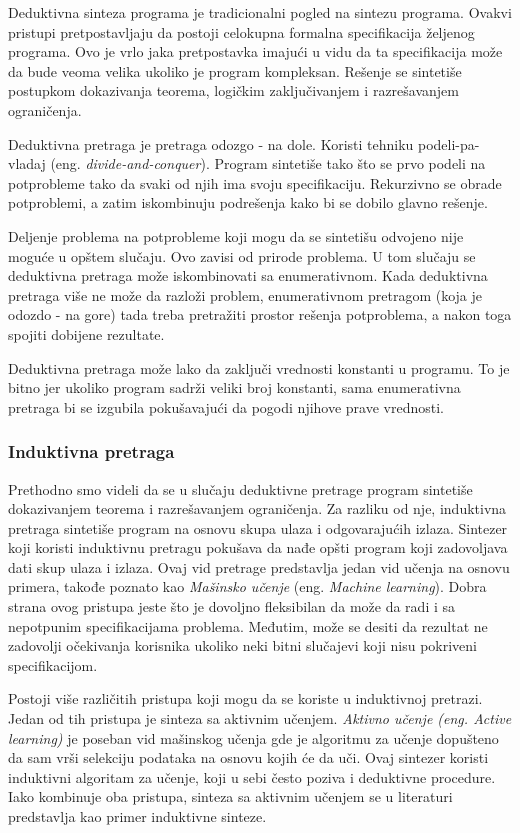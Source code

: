 Deduktivna sinteza programa je tradicionalni pogled na sintezu programa. Ovakvi pristupi pretpostavljaju da postoji celokupna formalna specifikacija željenog programa. Ovo je vrlo jaka pretpostavka imajući u vidu da ta specifikacija može da bude veoma velika ukoliko je program kompleksan. Rešenje se sintetiše postupkom dokazivanja teorema, logičkim zaključivanjem i razrešavanjem ograničenja.

Deduktivna pretraga je pretraga odozgo - na dole. Koristi tehniku podeli-pa-vladaj (eng. \emph{divide-and-conquer}). Program sintetiše tako što se prvo podeli na potprobleme tako da svaki od njih ima svoju specifikaciju. Rekurzivno se obrade potproblemi, a zatim iskombinuju podrešenja kako bi se dobilo glavno rešenje.

Deljenje problema na potprobleme koji mogu da se sintetišu odvojeno nije moguće u opštem slučaju. Ovo zavisi od prirode problema. U tom slučaju se deduktivna pretraga može iskombinovati sa enumerativnom. Kada deduktivna pretraga više ne može da razloži problem, enumerativnom pretragom (koja je odozdo - na gore) tada treba pretražiti prostor rešenja potproblema, a nakon toga spojiti dobijene rezultate.

Deduktivna pretraga može lako da zaključi vrednosti konstanti u programu. To je bitno jer ukoliko program sadrži veliki broj konstanti, sama enumerativna pretraga bi se izgubila pokušavajući da pogodi njihove prave vrednosti. 

\subsubsection{Induktivna pretraga}
\label{subsubsec:Induktivna}

Prethodno smo videli da se u slučaju deduktivne pretrage program sintetiše dokazivanjem teorema i razrešavanjem ograničenja. Za razliku od nje, induktivna pretraga sintetiše program na osnovu skupa ulaza i odgovarajućih izlaza. Sintezer koji koristi induktivnu pretragu pokušava da nađe opšti program koji zadovoljava dati skup ulaza i izlaza. Ovaj vid pretrage predstavlja jedan vid učenja na osnovu primera, takođe poznato kao \emph{Mašinsko učenje} (eng. \emph{Machine learning}). Dobra strana ovog pristupa jeste što je dovoljno fleksibilan da može da radi i sa nepotpunim specifikacijama problema. Međutim, može se desiti da rezultat ne zadovolji očekivanja korisnika ukoliko neki bitni slučajevi koji nisu pokriveni specifikacijom.

Postoji više različitih pristupa koji mogu da se koriste u induktivnoj pretrazi. Jedan od tih pristupa je sinteza sa aktivnim učenjem. \emph{Aktivno učenje (eng. \emph{Active learning})} je poseban vid mašinskog učenja gde je algoritmu za učenje dopušteno da sam vrši selekciju podataka na osnovu kojih će da uči. Ovaj sintezer koristi induktivni algoritam za učenje, koji u sebi često poziva i deduktivne procedure. Iako kombinuje oba pristupa, sinteza sa aktivnim učenjem se u literaturi predstavlja kao primer induktivne sinteze.

